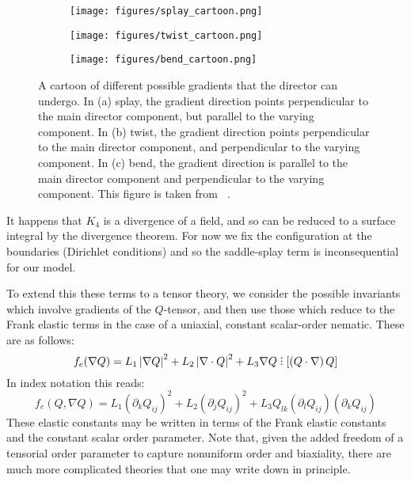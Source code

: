 \documentclass[reqno]{article}
\DeclareRobustCommand{\divby}{%
  \mathrel{\vbox{\baselineskip.65ex\lineskiplimit0pt\hbox{.}\hbox{.}\hbox{.}}}%
}
\begin{document}
  \begin{figure}[h]
    \centering
    \begin{subfigure}{0.45\textwidth}
      \texttt{[image: figures/splay\_cartoon.png]}
      \caption{}
      \label{fig:splay-cartoon}
    \end{subfigure}
    \hfill
    \begin{subfigure}{0.45\textwidth}
      \texttt{[image: figures/twist\_cartoon.png]}
      \caption{}
      \label{fig:twist-cartoon}
    \end{subfigure}
    \hfill
    \begin{subfigure}{0.45\textwidth}
      \texttt{[image: figures/bend\_cartoon.png]}
      \caption{}
      \label{fig:bend-cartoon}
    \end{subfigure}
    \caption{A cartoon of different possible gradients that the director can
      undergo. In (a) splay, the gradient direction points perpendicular to the
      main director component, but parallel to the varying component. In (b)
      twist, the gradient direction points perpendicular to the main director
      component, and perpendicular to the varying component. In (c) bend, the
      gradient direction is parallel to the main director component and
      perpendicular to the varying component. This figure is taken from
      ~\cite{selinger_introduction_2016}.}
    \label{fig:deformation-cartoon}
  \end{figure}
  It happens that $K_4$ is a divergence of a field, and so can be reduced to a
  surface integral by the divergence theorem.
  For now we fix the configuration at the boundaries (Dirichlet conditions) and
  so the saddle-splay term is inconsequential for our model.

  To extend this these terms to a tensor theory, we consider the possible
  invariants which involve gradients of the $Q$-tensor, and then use those which
  reduce to the Frank elastic terms in the case of a uniaxial, constant
  scalar-order nematic.
  These are as follows:
  \begin{equation} \label{eq:elastic-free-energy}
    f_e (\nabla Q)
    = L_1 \left| \nabla Q \right|^2
    + L_2 \left| \nabla \cdot Q \right|^2
    + L_3 \nabla Q  \divby \left[ \left( Q \cdot \nabla \right) Q \right]
  \end{equation}
  In index notation this reads:
  \begin{equation}
    f_e (Q, \nabla Q)
    =
    L_1 \left( \partial_k Q_{ij} \right)^2
    + L_2 \left( \partial_j Q_{ij} \right)^2
    + L_3 Q_{lk} \left( \partial_{l} Q_{ij} \right) \left( \partial_k Q_{ij} \right)
  \end{equation}
  These elastic constants may be written in terms of the Frank elastic constants
  and the constant scalar order parameter.
  Note that, given the added freedom of a tensorial order parameter to capture
  nonuniform order and biaxiality, there are much more complicated theories that
  one may write down in principle.
  
\end{document}
